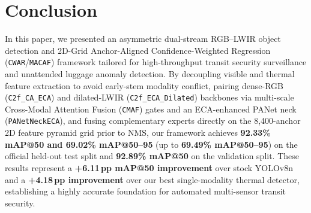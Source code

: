 \documentclass[journal,twoside,web]{ieeecolor}
\begin{document}
\section{Conclusion}
\label{sec:conclusion}
In this paper, we presented an asymmetric dual-stream RGB--LWIR object detection and 2D-Grid Anchor-Aligned Confidence-Weighted Regression (\texttt{CWAR}/\texttt{MACAF}) framework tailored for high-throughput transit security surveillance and unattended luggage anomaly detection. By decoupling visible and thermal feature extraction to avoid early-stem modality conflict, pairing dense-RGB (\texttt{C2f\_CA\_ECA}) and dilated-LWIR (\texttt{C2f\_ECA\_Dilated}) backbones via multi-scale Cross-Modal Attention Fusion (\texttt{CMAF}) gates and an ECA-enhanced PANet neck (\texttt{PANetNeckECA}), and fusing complementary experts directly on the 8,400-anchor 2D feature pyramid grid prior to NMS, our framework achieves \textbf{92.33\% mAP@50 and 69.02\% mAP@50--95} (up to \textbf{69.49\% mAP@50--95}) on the official held-out test split and \textbf{92.89\% mAP@50} on the validation split. These results represent a \textbf{+6.11\,pp mAP@50 improvement} over stock YOLOv8n and a \textbf{+4.18\,pp improvement} over our best single-modality thermal detector, establishing a highly accurate foundation for automated multi-sensor transit security.



\end{document}

